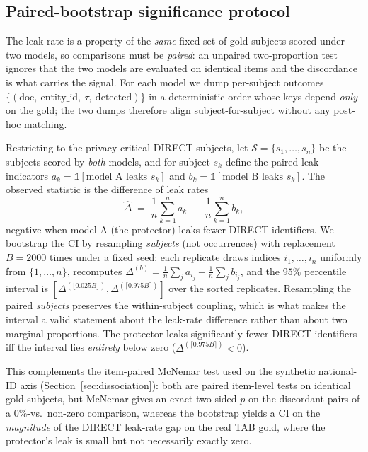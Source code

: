 \documentclass[11pt]{article}
\begin{document}
\subsection{Paired-bootstrap significance protocol}
\label{subsec:paired-bootstrap}
The leak rate is a property of the \emph{same} fixed set of gold subjects scored under two
models, so comparisons must be \emph{paired}: an unpaired two-proportion test ignores that
the two models are evaluated on identical items and the discordance is what carries the
signal. For each model we dump per-subject outcomes
$\{(\text{doc},\ \text{entity\_id},\ \tau,\ \mathrm{detected})\}$ in a deterministic order
whose keys depend \emph{only} on the gold; the two dumps therefore align subject-for-subject
without any post-hoc matching.

Restricting to the privacy-critical DIRECT subjects, let
$\mathcal{S} = \{s_1,\dots,s_n\}$ be the subjects scored by \emph{both} models, and for
subject $s_k$ define the paired leak indicators
$a_k = \mathbb{1}[\text{model A leaks } s_k]$ and
$b_k = \mathbb{1}[\text{model B leaks } s_k]$. The observed statistic is the difference of
leak rates
\[
  \widehat{\Delta} \;=\; \frac{1}{n}\sum_{k=1}^{n} a_k \;-\; \frac{1}{n}\sum_{k=1}^{n} b_k,
\]
negative when model A (the protector) leaks fewer DIRECT identifiers. We bootstrap the CI
by resampling \emph{subjects} (not occurrences) with replacement $B = 2000$ times under a
fixed seed: each replicate draws indices $i_1,\dots,i_n$ uniformly from $\{1,\dots,n\}$,
recomputes $\Delta^{(b)} = \tfrac{1}{n}\sum_j a_{i_j} - \tfrac{1}{n}\sum_j b_{i_j}$, and the
$95\%$ percentile interval is $[\Delta^{(\lfloor 0.025B\rfloor)},
\Delta^{(\lceil 0.975B\rceil)}]$ over the sorted replicates. Resampling the paired
\emph{subjects} preserves the within-subject coupling, which is what makes the interval a
valid statement about the leak-rate difference rather than about two marginal proportions.
The protector leaks significantly fewer DIRECT identifiers iff the interval lies
\emph{entirely} below zero ($\Delta^{(\lceil 0.975B\rceil)} < 0$).

This complements the item-paired McNemar test used on the synthetic national-ID axis
(Section~\ref{sec:dissociation}): both are paired item-level tests on identical gold
subjects, but McNemar gives an exact two-sided $p$ on the discordant pairs of a $0\%$-vs.\
non-zero comparison, whereas the bootstrap yields a CI on the \emph{magnitude} of the
DIRECT leak-rate gap on the real TAB gold, where the protector's leak is small but not
necessarily exactly zero.
\end{document}
